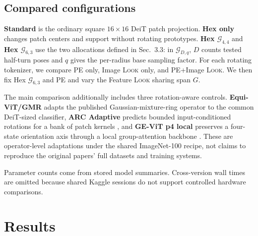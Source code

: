 \documentclass[10pt]{article}
\newcommand{\look}{\textsc{Look}}
\newcommand{\geom}[2]{\ensuremath{\mathcal{G}_{#1,#2}}}
\begin{document}
\subsection{Compared configurations}

\textbf{Standard} is the ordinary square $16\times16$ DeiT patch projection.
\textbf{Hex only} changes patch centers and support without rotating
prototypes. \textbf{Hex \geom{4}{4}} and \textbf{Hex \geom{6}{3}} use the two
allocations defined in Sec.~3.3: in \geom{D}{q}, $D$ counts tested half-turn
poses and $q$ gives the per-radius base sampling factor. For each rotating
tokenizer, we compare PE only, Image \look{} only, and PE+Image \look{}. We
then fix Hex \geom{6}{3} and PE and vary the Feature \look{} sharing span $G$.

The main comparison additionally includes three rotation-aware controls.
\textbf{Equi-ViT/GMR} adapts the published Gaussian-mixture-ring operator
\citep{chen2026equivit} to the common DeiT-sized classifier,
\textbf{ARC Adaptive} predicts bounded input-conditioned rotations for a bank
of patch kernels \citep{pu2023arc}, and \textbf{GE-ViT p4 local} preserves a
four-state orientation axis through a local group-attention backbone
\citep{xu2023e2vit}. These are operator-level adaptations under the
shared ImageNet-100 recipe, not claims to reproduce the original papers' full
datasets and training systems.

Parameter counts come from stored model summaries. Cross-version wall times are
omitted because shared Kaggle sessions do not support controlled hardware
comparisons.

\clearpage
\section{Results}
\end{document}
